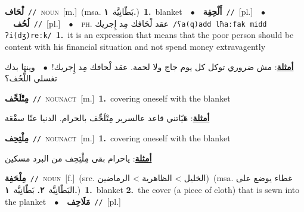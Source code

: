 \documentclass[10pt,a4paper,twoside]{article} %
\begin{document}
\begin{multicols}{2}
{\setlength\topsep{0pt}\textbf{\foreignlanguage{arabic}{لْحَاف}}\ {\color{gray}\texttt{//}\color{black}}\ \textsc{noun}\ [m.]\ \color{gray}(msa. \foreignlanguage{arabic}{بَطّانِيَّة}~\foreignlanguage{arabic}{\textbf{١.}})\color{black}\ \textbf{1.}~blanket\ \ $\bullet$\ \ \setlength\topsep{0pt}\textbf{\foreignlanguage{arabic}{أَلْحِفِة}}\ {\color{gray}\texttt{//}\color{black}}\ [pl.]\ \ $\bullet$\ \ \setlength\topsep{0pt}\textbf{\foreignlanguage{arabic}{لُحُف}}\ {\color{gray}\texttt{//}\color{black}}\ [pl.]\ \ $\bullet$\ \ \textsc{ph.} \color{gray} \foreignlanguage{arabic}{عقد لْحَافك مِد إِجريك}\color{black}\ {\color{gray}\texttt{/{\sffamily ʕa(q)add lħaːfak midd ʔi(dʒ)reːk}/}\color{black}}\ \textbf{1.}~it is an expression that means that the poor person should be content with his financial situation and not spend money extravagently\  \begin{flushright}\color{gray}\foreignlanguage{arabic}{\textbf{\underline{\foreignlanguage{arabic}{أمثلة}}}: مش ضروري توكل كل يوم جاج ولا لحمة. عقد لْحافك مِد إِجريك!\ $\bullet$\ \  وينتا بدك تغسلي اللُّحُف؟}\end{flushright}\color{black}} \vspace{2mm}

{\setlength\topsep{0pt}\textbf{\foreignlanguage{arabic}{مِتْلَحِّف}}\ {\color{gray}\texttt{//}\color{black}}\ \textsc{noun\textunderscore act}\ [m.]\ \textbf{1.}~covering oneself with the blanket\  \begin{flushright}\color{gray}\foreignlanguage{arabic}{\textbf{\underline{\foreignlanguage{arabic}{أمثلة}}}: هَيّاتني قاعد عالسرير مِتْلَحِّف بالحرام. الدنيا عنّا سقْعَة}\end{flushright}\color{black}} \vspace{2mm}

{\setlength\topsep{0pt}\textbf{\foreignlanguage{arabic}{مِلْتِحِف}}\ {\color{gray}\texttt{//}\color{black}}\ \textsc{noun\textunderscore act}\ [m.]\ \textbf{1.}~covering oneself with the blanket\  \begin{flushright}\color{gray}\foreignlanguage{arabic}{\textbf{\underline{\foreignlanguage{arabic}{أمثلة}}}: ياحرام بقى مِلْتِحِف من البرد مسكين}\end{flushright}\color{black}} \vspace{2mm}

{\setlength\topsep{0pt}\textbf{\foreignlanguage{arabic}{مِلْحَفِة}}\ {\color{gray}\texttt{//}\color{black}}\ \textsc{noun}\ [f.]\ (src. \color{gray}\foreignlanguage{arabic}{الخليل > الظاهرية > الرماضين}\color{black})\ \color{gray}(msa. \foreignlanguage{arabic}{غطاء يوضع على البَطّانِيَّة}~\foreignlanguage{arabic}{\textbf{٢.}}  \foreignlanguage{arabic}{بَطّانِيَّة}~\foreignlanguage{arabic}{\textbf{١.}})\color{black}\ \textbf{1.}~blanket  \textbf{2.}~the cover (a piece of cloth) that is sewn into the planket\ \ $\bullet$\ \ \setlength\topsep{0pt}\textbf{\foreignlanguage{arabic}{مَلَاحِف}}\ {\color{gray}\texttt{//}\color{black}}\ [pl.]\ } \vspace{2mm}


\end{multicols}
\end{document}
